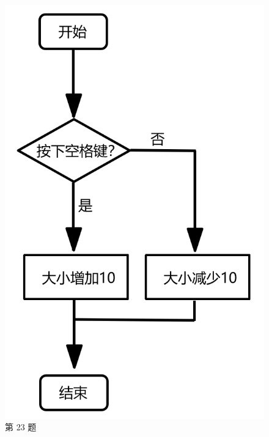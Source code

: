 \documentclass[10pt, a4paper]{article}
\begin{document}
\begin{enumerate}
\begin{figure}[htbp]
\begin{minipage}[t]{.14\textwidth}
                \includegraphics[width=\textwidth]{figure/23.png}
                \caption*{第 23 题}
            \end{minipage}
            \begin{minipage}[t]{.46\textwidth}
                \centering
                \begin{minipage}[t]{.55\textwidth}
                    \centering

\end{minipage}
\end{minipage}
\end{figure}
\end{enumerate}
\end{document}
